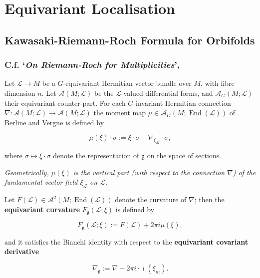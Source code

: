 \documentclass{article}
\newcommand{\ra}{\rightarrow}
\newcommand{\mcA}{\mathcal{A}}
\newcommand{\mcL}{\mathcal{L}}
\newcommand{\mfg}{\mathfrak{g}}
\DeclareMathOperator{\End}{End}
\begin{document}
	
	\section{Equivariant Localisation}
	
	\subsection{Kawasaki-Riemann-Roch Formula for Orbifolds}\label{subsec:KRR}
	
	\subsubsection{C.f. `\emph{On Riemann-Roch for Multiplicities}', \cite{Meinrenken1996}}\label{subsubsec:Meinrenken1996}
	
	Let $\mcL \ra M$ be a $G$-equivariant Hermitian vector bundle over $M$, with fibre dimension $n$. Let $\mcA(M; \mcL)$ be the $\mcL$-valued differential forms, and $\mcA_{G}(M; \mcL)$ their equivariant counter-part. For each $G$-invariant Hermitian connection $\nabla : \mcA(M; \mcL) \ra \mcA(M; \mcL)$ the moment map $\mu \in \mcA_{G}(M; \End(\mcL))$ of Berline and Vergne \cite{Berline1985} is defined by
	
	\begin{equation*}
		\mu(\xi) \cdot \sigma := \xi \cdot \sigma - \nabla_{\xi_{M}} \cdot \sigma,
	\end{equation*}
	
	where $\sigma \mapsto \xi \cdot \sigma$ denote the representation of $\mfg$ on the space of sections.
	
	\emph{Geometrically, $\mu(\xi)$ is the vertical part (with respect to the connection $\nabla$) of the fundamental vector field $\xi_{\mcL}$ on $\mcL$.}
	
	Let $F(\mcL) \in \mcA^{2}(M; \End(\mcL))$ denote the curvature of $\nabla$; then the \textbf{equivariant curvature} $F_{\mfg}(\mcL; \xi)$ is defined by
	
	\begin{equation*}
		F_{\mfg}(\mcL;\xi) := F(\mcL) + 2\pi i \mu(\xi),
	\end{equation*}
	
	and it satisfies the Bianchi identity with respect to the \textbf{equivariant covariant derivative}
	
	\begin{equation*}
		\nabla_{\mfg} := \nabla - 2\pi i \cdot \imath(\xi_{m}).
	\end{equation*}
	
\end{document}
